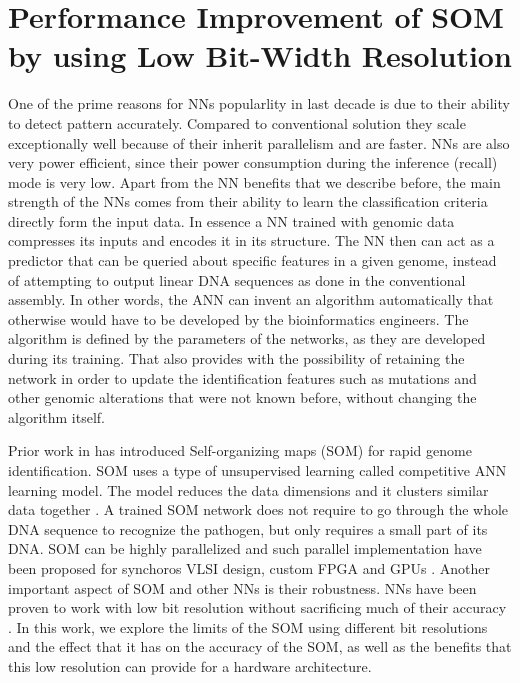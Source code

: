 \graphicspath{{./Ch5-SOM/images/}}

\chapter{Performance Improvement of SOM by using Low Bit-Width Resolution} \label{chap:SOM}
One of the prime reasons for NNs popularlity in last decade is due to their ability to detect pattern accurately. Compared to conventional solution they scale exceptionally well because of their inherit parallelism and are faster. NNs are also very power efficient, since their power consumption during the inference (recall) mode is very low. Apart from the NN benefits that we describe before, the main strength of the NNs comes from their ability to learn the classification criteria directly form the input data. In essence a NN trained with genomic data compresses its inputs and encodes it in its structure. The NN then can act as a predictor that can be queried about specific features in a given genome, instead of attempting to output linear DNA sequences as done in the conventional assembly. In other words, the ANN can invent an algorithm automatically that otherwise would have to be developed by the bioinformatics engineers. The algorithm is defined by the parameters of the networks, as they are developed during its training. That also provides with the possibility of retaining the network in order to update the identification features such as mutations and other genomic alterations that were not known before, without changing the algorithm itself.

Prior work in \cite{Yang2018RiBoSOM} has introduced Self-organizing maps (SOM) for rapid genome identification. SOM uses a type of unsupervised learning called competitive ANN learning model. The model reduces the data dimensions and it clusters similar data together \cite{Kohonen2013}. A trained SOM network does not require to go through the whole DNA sequence to recognize the pathogen, but only requires a small part of its DNA. SOM can be highly parallelized and such parallel implementation have been proposed for synchoros VLSI design, custom FPGA and GPUs \cite{Yang2018RiBoSOM, Porrmann2006, McConnell2012}. Another important aspect of SOM and other NNs is their robustness. NNs have been proven to work with low bit resolution without sacrificing much of their accuracy \cite{8056820}. In this work, we explore the limits of the SOM using different bit resolutions and the effect that it has on the accuracy of the SOM, as well as the benefits that this low resolution can provide for a hardware architecture. 

